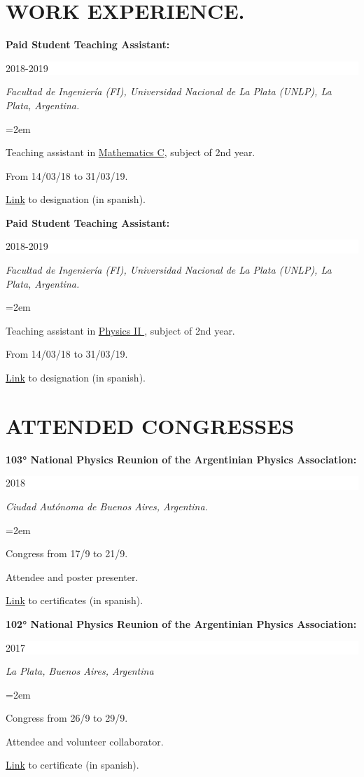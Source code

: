 \documentclass[paper=letter,fontsize=11pt]{scrartcl} %
\newcommand{\sepspace}{\vspace*{1em}}		%
\newcommand{\NewPart}[2]{\section*{\uppercase{#1} \small \normalfont #2}}
\newcommand{\WorkEntry}[5]{
		\noindent \textbf{#1}
        \noindent \small \textit{#2}
        \hfill      %
        \colorbox{White}{%
			\parbox{6em}{%
			\hfill\color{Black}#3}} \par  %
		\noindent \textit{#4} \par        %
		\noindent\hangindent=2em\hangafter=0 \small #5 %
		\normalsize \par}
\begin{document}
\NewPart{Work Experience.}{}

\sepspace



\WorkEntry{Paid Student Teaching Assistant:}
{}{2018-2019}
{Facultad de Ingeniería (FI), Universidad Nacional de La Plata (UNLP), La Plata, Argentina.}
{

Teaching assistant in {\href{https://www.ing.unlp.edu.ar/catedras/F0304/}{Mathematics C}}, subject of 2nd year.

From 14/03/18 to 31/03/19.

{\href{https://drive.google.com/drive/folders/1v960J-ofrC-xrrzCB4wOwtd4gdpVOSZy?usp=sharing}{Link} to designation (in spanish).}
}

\sepspace

\WorkEntry{Paid Student Teaching Assistant:}
{}{2018-2019}
{Facultad de Ingeniería (FI), Universidad Nacional de La Plata (UNLP), La Plata, Argentina.}
{

Teaching assistant in {\href{https://www.ing.unlp.edu.ar/catedras/F0305/}{Physics II  }}, subject of 2nd year.

From 14/03/18 to 31/03/19.

\href{https://drive.google.com/drive/folders/1vABkaZMn7Y_dWg1AbqDlz4lgAiekRv09?usp=sharing}{Link} to designation (in spanish).
}

\sepspace



\NewPart{Attended congresses}{}

\sepspace

\WorkEntry{103° National Physics Reunion of the Argentinian Physics Association:}{}{2018}{Ciudad Autónoma de Buenos Aires, Argentina.}{

Congress from 17/9 to 21/9.

Attendee and poster presenter.

{\href{https://drive.google.com/drive/folders/1WnbBy38R2___5leniTvo4lFK3aMaCwk7?usp=sharing}{Link}} to certificates (in spanish).
}


\newpage

\WorkEntry{102° National Physics Reunion of the Argentinian Physics Association:}{}{2017}{La Plata,  Buenos Aires, Argentina}{

Congress from 26/9 to 29/9.

Attendee and volunteer collaborator.

{\href{https://drive.google.com/drive/folders/166mUi8z6QCz5kGK86sLKj27jQiXhEmrc?usp=sharing}{Link}} to certificate (in spanish).
}
\end{document}
